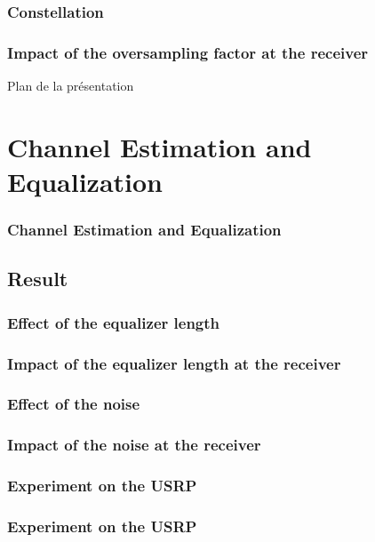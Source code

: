 \documentclass[11pt]{beamer}
\begin{document}
\subsubsection{Constellation}

\begin{frame}
\frametitle{Impact of the oversampling factor at the receiver}


\end{frame}

{
	\begin{frame}[noframenumbering]{Plan de la présentation}
		\tableofcontents
	\end{frame}
}

\section{Channel Estimation and Equalization}
\begin{frame}
\frametitle{Channel Estimation and Equalization}

\end{frame}

\begin{frame}


\end{frame}
\subsection{Result}
\subsubsection{Effect of the equalizer length}
\begin{frame}
\frametitle{Impact of the equalizer length at the receiver}


\end{frame}
\subsubsection{Effect of the noise}
\begin{frame}
\frametitle{Impact of the noise at the receiver}

\end{frame}
\subsubsection{Experiment on the USRP}
\begin{frame}
\frametitle{Experiment on the USRP}

\end{frame}
\end{document}

